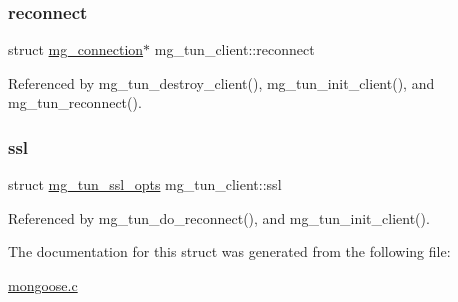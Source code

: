 \subsubsection{\texorpdfstring{reconnect}{reconnect}}
{\footnotesize\ttfamily struct \hyperlink{structmg__connection}{mg\+\_\+connection}$\ast$ mg\+\_\+tun\+\_\+client\+::reconnect}



Referenced by mg\+\_\+tun\+\_\+destroy\+\_\+client(), mg\+\_\+tun\+\_\+init\+\_\+client(), and mg\+\_\+tun\+\_\+reconnect().

\mbox{\label{structmg__tun__client_a8e2503ec635c4e69b547b6aed64bed37_a8e2503ec635c4e69b547b6aed64bed37}} 
\subsubsection{\texorpdfstring{ssl}{ssl}}
{\footnotesize\ttfamily struct \hyperlink{structmg__tun__ssl__opts}{mg\+\_\+tun\+\_\+ssl\+\_\+opts} mg\+\_\+tun\+\_\+client\+::ssl}



Referenced by mg\+\_\+tun\+\_\+do\+\_\+reconnect(), and mg\+\_\+tun\+\_\+init\+\_\+client().



The documentation for this struct was generated from the following file\+:\begin{DoxyCompactItemize}
\item 
\hyperlink{mongoose_8c}{mongoose.\+c}\end{DoxyCompactItemize}
